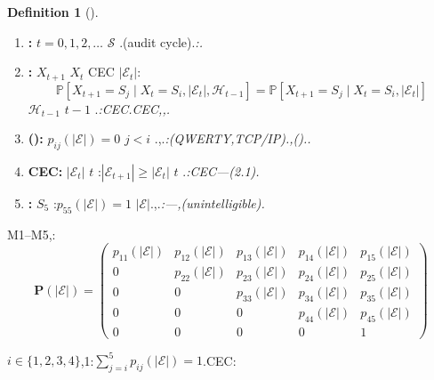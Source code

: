 \documentclass[12pt,a4paper]{article}
\theoremstyle{definition}
\newtheorem{definition}{Definition}[section]
\theoremstyle{remark}
\begin{document}
\begin{definition}[]
\label{def:markov-assumptions}
\begin{enumerate}[label=\textbf{M\arabic*}, leftmargin=*, itemsep=4pt]
\item \textbf{:}  $t = 0, 1, 2, \ldots$  $\mathcal{S}$ .(audit cycle).\hfill\textit{:.}

\item \textbf{:}  $X_{t+1}$  $X_t$ CEC $|\mathcal{E}_t|$:
\begin{equation}
\mathbb{P}[X_{t+1} = S_j \mid X_t = S_i, |\mathcal{E}_t|, \mathcal{H}_{t-1}] = \mathbb{P}[X_{t+1} = S_j \mid X_t = S_i, |\mathcal{E}_t|]
\end{equation}
 $\mathcal{H}_{t-1}$  $t-1$ .\hfill\textit{:CEC.CEC,,.}

\item \textbf{():} $p_{ij}(|\mathcal{E}|) = 0$  $j < i$ .,.\hfill\textit{:(QWERTY,TCP/IP).,()..}

\item \textbf{CEC:} $|\mathcal{E}_t|$  $t$ :$|\mathcal{E}_{t+1}| \geq |\mathcal{E}_t|$  $t$ .\hfill\textit{:CEC---(2.1).}

\item \textbf{:} $S_5$ :$p_{55}(|\mathcal{E}|) = 1$  $|\mathcal{E}|$.,.\hfill\textit{:---,(unintelligible).}
\end{enumerate}
\end{definition}

M1--M5,:
\begin{equation}
\mathbf{P}(|\mathcal{E}|) =
\begin{pmatrix}
p_{11}(|\mathcal{E}|) & p_{12}(|\mathcal{E}|) & p_{13}(|\mathcal{E}|) & p_{14}(|\mathcal{E}|) & p_{15}(|\mathcal{E}|) \\
0 & p_{22}(|\mathcal{E}|) & p_{23}(|\mathcal{E}|) & p_{24}(|\mathcal{E}|) & p_{25}(|\mathcal{E}|) \\
0 & 0 & p_{33}(|\mathcal{E}|) & p_{34}(|\mathcal{E}|) & p_{35}(|\mathcal{E}|) \\
0 & 0 & 0 & p_{44}(|\mathcal{E}|) & p_{45}(|\mathcal{E}|) \\
0 & 0 & 0 & 0 & 1
\end{pmatrix}
\label{eq:transition-matrix}
\end{equation}

 $i \in \{1,2,3,4\}$,1:$\sum_{j=i}^5 p_{ij}(|\mathcal{E}|) = 1$.CEC:
\end{document}
